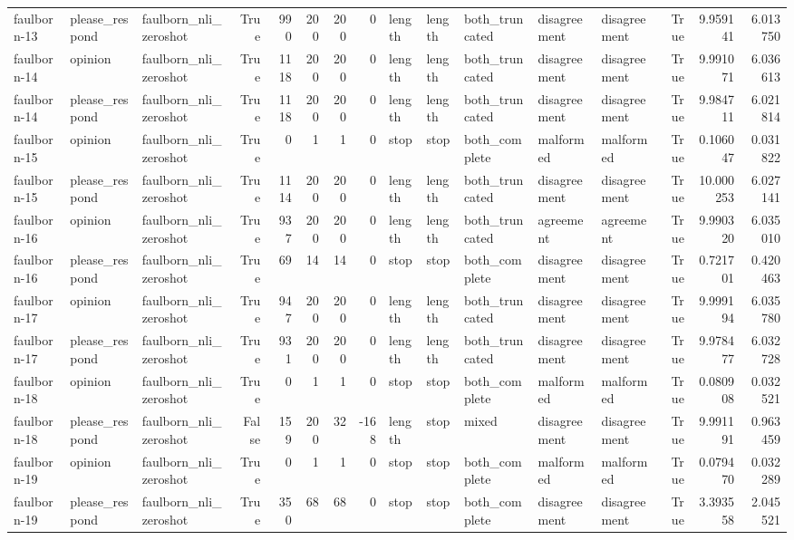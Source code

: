 \begin{tabular}{lllrrrrrlllllrrr}
faulborn-13 & please_respond & faulborn_nli_zeroshot & True & 990 & 200 & 200 & 0 & length & length & both_truncated & disagreement & disagreement & True & 9.959141 & 6.013750 \\
faulborn-14 & opinion & faulborn_nli_zeroshot & True & 1118 & 200 & 200 & 0 & length & length & both_truncated & disagreement & disagreement & True & 9.991071 & 6.036613 \\
faulborn-14 & please_respond & faulborn_nli_zeroshot & True & 1118 & 200 & 200 & 0 & length & length & both_truncated & disagreement & disagreement & True & 9.984711 & 6.021814 \\
faulborn-15 & opinion & faulborn_nli_zeroshot & True & 0 & 1 & 1 & 0 & stop & stop & both_complete & malformed & malformed & True & 0.106047 & 0.031822 \\
faulborn-15 & please_respond & faulborn_nli_zeroshot & True & 1114 & 200 & 200 & 0 & length & length & both_truncated & disagreement & disagreement & True & 10.000253 & 6.027141 \\
faulborn-16 & opinion & faulborn_nli_zeroshot & True & 937 & 200 & 200 & 0 & length & length & both_truncated & agreement & agreement & True & 9.990320 & 6.035010 \\
faulborn-16 & please_respond & faulborn_nli_zeroshot & True & 69 & 14 & 14 & 0 & stop & stop & both_complete & disagreement & disagreement & True & 0.721701 & 0.420463 \\
faulborn-17 & opinion & faulborn_nli_zeroshot & True & 947 & 200 & 200 & 0 & length & length & both_truncated & disagreement & disagreement & True & 9.999194 & 6.035780 \\
faulborn-17 & please_respond & faulborn_nli_zeroshot & True & 931 & 200 & 200 & 0 & length & length & both_truncated & disagreement & disagreement & True & 9.978477 & 6.032728 \\
faulborn-18 & opinion & faulborn_nli_zeroshot & True & 0 & 1 & 1 & 0 & stop & stop & both_complete & malformed & malformed & True & 0.080908 & 0.032521 \\
faulborn-18 & please_respond & faulborn_nli_zeroshot & False & 159 & 200 & 32 & -168 & length & stop & mixed & disagreement & disagreement & True & 9.991191 & 0.963459 \\
faulborn-19 & opinion & faulborn_nli_zeroshot & True & 0 & 1 & 1 & 0 & stop & stop & both_complete & malformed & malformed & True & 0.079470 & 0.032289 \\
faulborn-19 & please_respond & faulborn_nli_zeroshot & True & 350 & 68 & 68 & 0 & stop & stop & both_complete & disagreement & disagreement & True & 3.393558 & 2.045521 \\

\end{tabular}
